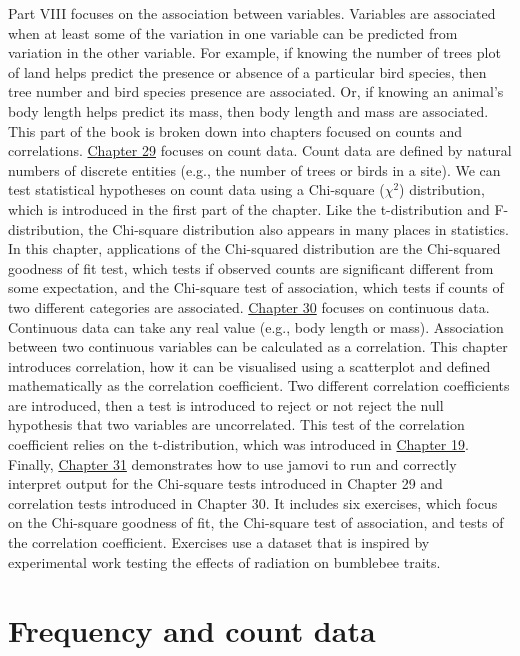 \documentclass[
]{scrbook}
\begin{document}
Part VIII focuses on the association between variables.
Variables are associated when at least some of the variation in one variable can be predicted from variation in the other variable.
For example, if knowing the number of trees plot of land helps predict the presence or absence of a particular bird species, then tree number and bird species presence are associated.
Or, if knowing an animal's body length helps predict its mass, then body length and mass are associated.
This part of the book is broken down into chapters focused on counts and correlations.
\protect\hyperlink{Chapter_29}{Chapter 29} focuses on count data.
Count data are defined by natural numbers of discrete entities (e.g., the number of trees or birds in a site).
We can test statistical hypotheses on count data using a Chi-square (\(\chi^{2}\)) distribution, which is introduced in the first part of the chapter.
Like the t-distribution and F-distribution, the Chi-square distribution also appears in many places in statistics.
In this chapter, applications of the Chi-squared distribution are the Chi-squared goodness of fit test, which tests if observed counts are significant different from some expectation, and the Chi-square test of association, which tests if counts of two different categories are associated.
\protect\hyperlink{Chapter_30}{Chapter 30} focuses on continuous data.
Continuous data can take any real value (e.g., body length or mass).
Association between two continuous variables can be calculated as a correlation.
This chapter introduces correlation, how it can be visualised using a scatterplot and defined mathematically as the correlation coefficient.
Two different correlation coefficients are introduced, then a test is introduced to reject or not reject the null hypothesis that two variables are uncorrelated.
This test of the correlation coefficient relies on the t-distribution, which was introduced in \protect\hyperlink{Chapter_19}{Chapter 19}.
Finally, \protect\hyperlink{Chapter_31}{Chapter 31} demonstrates how to use jamovi to run and correctly interpret output for the Chi-square tests introduced in Chapter 29 and correlation tests introduced in Chapter 30.
It includes six exercises, which focus on the Chi-square goodness of fit, the Chi-square test of association, and tests of the correlation coefficient.
Exercises use a dataset that is inspired by experimental work testing the effects of radiation on bumblebee traits.

\hypertarget{Chapter_29}{%
\chapter{Frequency and count data}\label{Chapter_29}}
\end{document}
